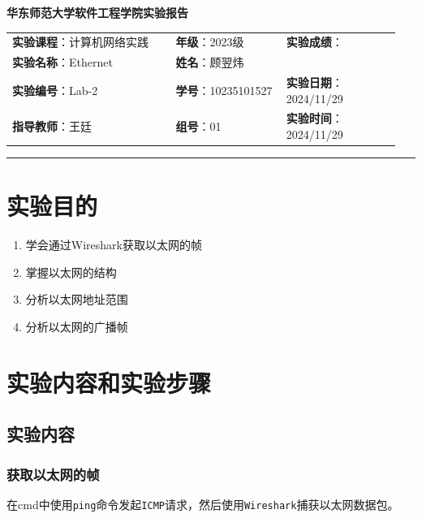 \documentclass{article}
\begin{document}
	\begin{center}
		{\Large{\textbf{\heiti 华东师范大学软件工程学院实验报告}}}
		\begin{table}[htb]
			\flushleft
			\begin{tabular}{p{0.4\linewidth}p{0.27\linewidth}p{0.28\linewidth}}\\
				\textbf{实验课程}：计算机网络实践  & \textbf{年级}：2023级       & \textbf{实验成绩}：  \\
				\textbf{实验名称}：Ethernet & \textbf{姓名}：顾翌炜         &                 \\
				\textbf{实验编号}：Lab-2     & \textbf{学号}：10235101527 & \textbf{实验日期}：2024/11/29  \\
				\textbf{指导教师}：王廷     & \textbf{组号}：01            & \textbf{实验时间}：2024/11/29  \\ 
			\end{tabular}
		\end{table}
	\end{center}
	\rule{\textwidth}{2pt}
	
	\section{实验目的}
	
	\begin{enumerate}[noitemsep, label={{\arabic*})}]
		\item 学会通过Wireshark获取以太网的帧
		\item 掌握以太网的结构
		\item 分析以太网地址范围
		\item 分析以太网的广播帧
	\end{enumerate}
	
	\section{实验内容和实验步骤}
	
	\subsection{实验内容}
	
	\subsubsection{获取以太网的帧}
	
	在cmd中使用\texttt{ping}命令发起\texttt{ICMP}请求，然后使用\texttt{Wireshark}捕获以太网数据包。
	
\end{document}
